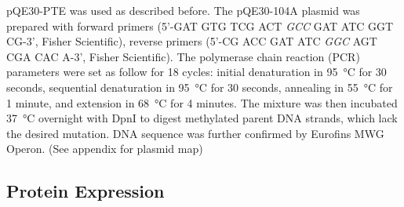 \begin{refsection}
pQE30-PTE was used as described before\cite{Baker2011b}. The pQE30-104A plasmid
was prepared with forward primers (5’-GAT GTG TCG ACT \emph{GCC} GAT ATC GGT
CG-3’, Fisher Scientific), reverse primers (5’-CG ACC GAT ATC \emph{GGC} AGT
CGA CAC A-3’, Fisher Scientific). The polymerase chain reaction (PCR)
parameters were set as follow for 18 cycles: initial denaturation in
\SI{95}{\celsius} for 30 seconds, sequential denaturation in \SI{95}{\celsius}
for 30 seconds, annealing in \SI{55}{\celsius} for 1 minute, and extension in
\SI{68}{\celsius} for 4 minutes. The mixture was then incubated
\SI{37}{\celsius} overnight with DpnI to digest methylated parent DNA strands,
which lack the desired mutation. DNA sequence was further confirmed by Eurofins
MWG Operon. (See appendix for plasmid map)

\subsection{Protein Expression}
\label{sec:protein-expression-method}


\end{refsection}
